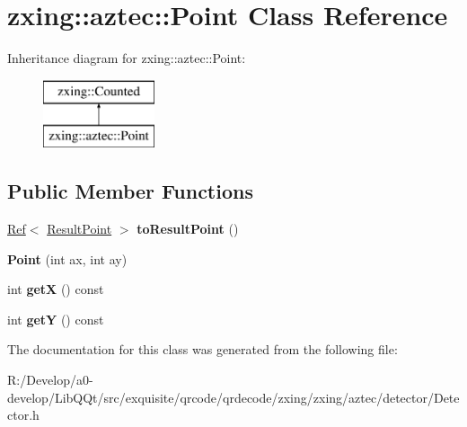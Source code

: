 \hypertarget{classzxing_1_1aztec_1_1_point}{}\section{zxing\+:\+:aztec\+:\+:Point Class Reference}
\label{classzxing_1_1aztec_1_1_point}
Inheritance diagram for zxing\+:\+:aztec\+:\+:Point\+:\begin{figure}[H]
\begin{center}
\leavevmode
\includegraphics[height=2.000000cm]{classzxing_1_1aztec_1_1_point}
\end{center}
\end{figure}
\subsection*{Public Member Functions}
\begin{DoxyCompactItemize}
\item 
\mbox{\label{classzxing_1_1aztec_1_1_point_a3c2856844909b2894f245539708fae8d}} 
\mbox{\hyperlink{classzxing_1_1_ref}{Ref}}$<$ \mbox{\hyperlink{classzxing_1_1_result_point}{Result\+Point}} $>$ {\bfseries to\+Result\+Point} ()
\item 
\mbox{\label{classzxing_1_1aztec_1_1_point_abe82e1a94d3a7ddd979f479bd8a6e353}} 
{\bfseries Point} (int ax, int ay)
\item 
\mbox{\label{classzxing_1_1aztec_1_1_point_aebcbdad62eecf36aba01b8e6e7f654fa}} 
int {\bfseries getX} () const
\item 
\mbox{\label{classzxing_1_1aztec_1_1_point_a6453c5df4a4e4776ea2947a41be0d642}} 
int {\bfseries getY} () const
\end{DoxyCompactItemize}


The documentation for this class was generated from the following file\+:\begin{DoxyCompactItemize}
\item 
R\+:/\+Develop/a0-\/develop/\+Lib\+Q\+Qt/src/exquisite/qrcode/qrdecode/zxing/zxing/aztec/detector/Detector.\+h\end{DoxyCompactItemize}
